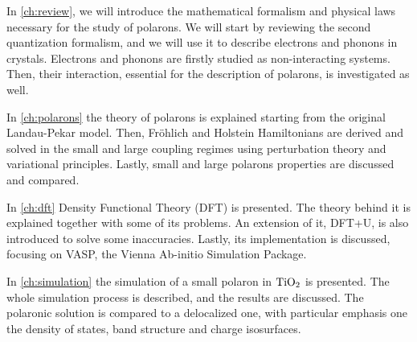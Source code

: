 In \cref{ch:review}, we will introduce the mathematical formalism and physical laws necessary for the study of polarons. We will start by reviewing the second quantization formalism, and we will use it to describe electrons and phonons in crystals. Electrons and phonons are firstly studied as non-interacting systems. Then, their interaction, essential for the description of polarons, is investigated as well.

In \cref{ch:polarons} the theory of polarons is explained starting from the original Landau-Pekar model. Then, Fröhlich and Holstein Hamiltonians are derived and solved in the small and large coupling regimes using perturbation theory and variational principles. Lastly, small and large polarons properties are discussed and compared.

In \cref{ch:dft} Density Functional Theory (DFT) is presented. The theory behind it is explained together with some of its problems. An extension of it, DFT+U, is also introduced to solve some inaccuracies. Lastly, its implementation is discussed, focusing on VASP, the Vienna Ab-initio Simulation Package.

In \cref{ch:simulation} the simulation of a small polaron in $\ce{TiO_2}$ is presented. The whole simulation process is described, and the results are discussed. The polaronic solution is compared to a delocalized one, with particular emphasis one the density of states, band structure and charge isosurfaces.